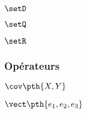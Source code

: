 \begin{latexcodesbs}
    $\setD$
\end{latexcodesbs}

\begin{latexcodesbs}
    $\setQ$
\end{latexcodesbs}

\begin{latexcodesbs}
    $\setR$
\end{latexcodesbs}

\subsubsection{Opérateurs}

\begin{latexcodesbs}
    $\cov\pth{X,Y}$
\end{latexcodesbs}

\begin{latexcodesbs}
    $\vect\pth{e_1,e_2,e_3}$
\end{latexcodesbs}